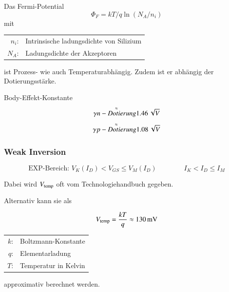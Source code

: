 Das Fermi-Potential
\[
    \Phi_F = kT/q \ln(N_A/n_i)
\]
mit 
\begin{tabular}{rl}
    $n_i$:& Intrinsische ladungsdichte von Silizium\\
    $N_A$:& Ladungsdichte der Akzeptoren
\end{tabular}
ist Prozess- wie auch Temperaturabhängig.
Zudem ist er abhängig der Dotierungsstärke.



Body-Effekt-Konstante
\[
    \gamma \overset{\approx}{n-Dotierung} \qty{1.46}{\sqrt{\volt}}
\]
\[
    \gamma \overset{\approx}{p-Dotierung} \qty{1.08}{\sqrt{\volt}}
\]



\subsubsection{Weak Inversion}

\vspace{-0.3cm}

$$ \boxed{ \text{EXP-Bereich: } V_K(I_D) < V_{GS} \leq V_M(I_D) \qquad \qquad I_K < I_D \leq I_M } $$  %


Dabei wird $V_{\rm temp}$ oft vom Technologiehandbuch gegeben. 

Alternativ kann sie als 

\begin{minipage}{0.4\columnwidth}
    \[
        V_{\rm temp} = \frac{kT}{q} \approx \qty{130}{\milli\volt}
    \]
\end{minipage}
\hfill
\begin{minipage}{0.5\columnwidth}
    \begin{tabular}{rl}
        $k$: & Boltzmann-Konstante \\
        $q$: & Elementarladung \\
        $T$: & Temperatur in Kelvin \\
    \end{tabular}
\end{minipage}

approximativ berechnet werden.

